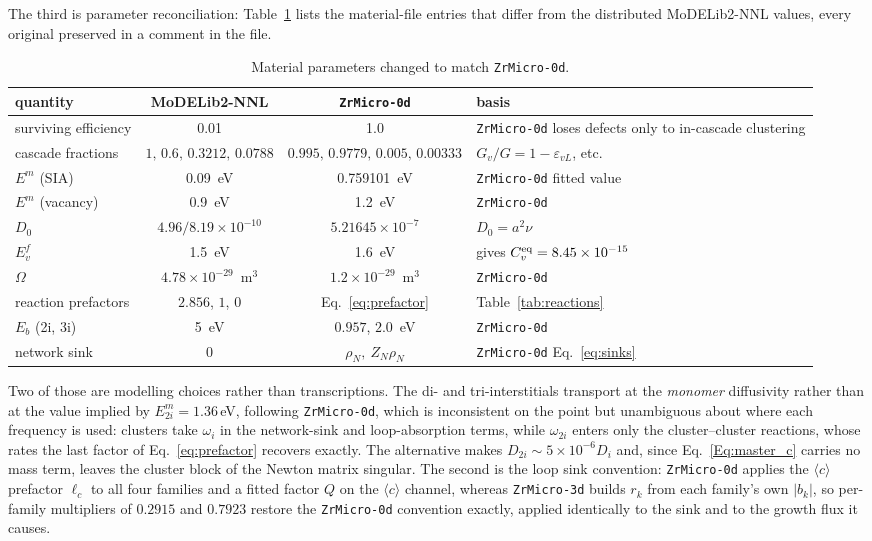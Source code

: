 \documentclass{article}
\newcommand{\cloop}{\ensuremath{\langle c\rangle}}
\newcommand{\ZrM}{\texttt{ZrMicro-3d}}
\newcommand{\MoD}{\textsf{MoDELib2-NNL}}
\newcommand{\ZrOd}{\texttt{ZrMicro-0d}}
\begin{document}
The third is parameter reconciliation: Table~\ref{tab:params} lists the
material-file entries that differ from the distributed {\MoD} values, every
original preserved in a comment in the file.

\begin{table}[htbp]
\centering
\caption{Material parameters changed to match {\ZrOd}.}
\label{tab:params}
\small
\begin{tabular}{@{}lccp{}@{}}
\toprule
quantity & \MoD{} & \ZrOd{} & basis \\
\midrule
surviving efficiency & 0.01 & 1.0 & \ZrOd{} loses defects only to in-cascade clustering \\
cascade fractions & $1,\,0.6,\,0.3212,\,0.0788$ & $0.995,\,0.9779,\,0.005,\,0.00333$ & $G_v/G = 1-\varepsilon_{vL}$, etc. \\
$E^m$ (SIA) & 0.09~eV & 0.759101~eV & \ZrOd{} fitted value \\
$E^m$ (vacancy) & 0.9~eV & 1.2~eV & \ZrOd{} \\
$D_0$ & $4.96/8.19\times10^{-10}$ & $5.21645\times 10^{-7}$ & $D_0 = a^2\nu$ \\
$E^f_v$ & 1.5~eV & 1.6~eV & gives $C_v^{\rm eq} = 8.45\times10^{-15}$ \\
$\Omega$ & $4.78\times10^{-29}$~m$^3$ & $1.2\times10^{-29}$~m$^3$ & \ZrOd{} \\
reaction prefactors & $2.856$, $1$, $0$ & Eq.~\eqref{eq:prefactor} & Table~\ref{tab:reactions} \\
$E_b$ (2i, 3i) & 5~eV & $0.957$, $2.0$~eV & \ZrOd{} \\
network sink & $0$ & $\rho_N,\ Z_N\rho_N$ & \ZrOd{} Eq.~\eqref{eq:sinks} \\
\bottomrule
\end{tabular}
\end{table}
Two of those are modelling choices rather than transcriptions. The di- and
tri-interstitials transport at the \emph{monomer} diffusivity rather than at the
value implied by $E^m_{2i}=1.36\,$eV, following {\ZrOd}, which is inconsistent on
the point but unambiguous about where each frequency is used: clusters take
$\omega_i$ in the network-sink and loop-absorption terms, while $\omega_{2i}$
enters only the cluster--cluster reactions, whose rates the last factor of
Eq.~\eqref{eq:prefactor} recovers exactly. The alternative makes
$D_{2i}\sim5\times10^{-6}D_i$ and, since Eq.~\eqref{Eq:master_c} carries no mass
term, leaves the cluster block of the Newton matrix singular. The second is the
loop sink convention: {\ZrOd} applies the \cloop{} prefactor $\ell_c$ to all four
families and a fitted factor $Q$ on the \cloop{} channel, whereas {\ZrM} builds
$r_k$ from each family's own $|b_k|$, so per-family multipliers of $0.2915$ and
$0.7923$ restore the {\ZrOd} convention exactly, applied identically to the sink
and to the growth flux it causes.
\end{document}
